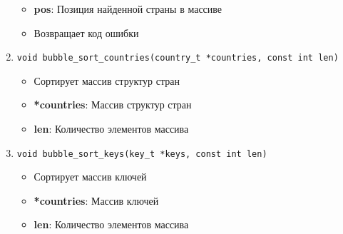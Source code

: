 \begin{enumerate}
\begin{itemize}
		\item \textbf{pos}: Позиция найденной страны в массиве
		\item Возвращает код ошибки
	\end{itemize}
	\item \texttt{void bubble\_sort\_countries(country\_t *countries, const int len)}
	\begin{itemize}
		\item Сортирует массив структур стран
		\item \textbf{*countries}: Массив структур стран
		\item \textbf{len}: Количество элементов массива
	\end{itemize}
	\item \texttt{void bubble\_sort\_keys(key\_t *keys, const int len)}
	\begin{itemize}
		\item Сортирует массив ключей
		\item \textbf{*countries}: Массив ключей
		\item \textbf{len}: Количество элементов массива
	\end{itemize}
\end{enumerate}
